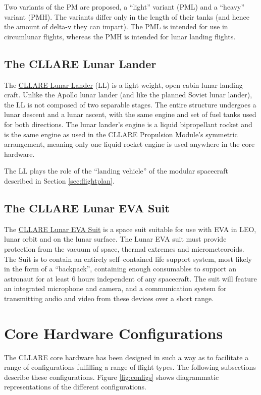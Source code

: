 \documentclass{report}
\begin{document}
Two variants of the PM are proposed, a ``light'' variant (PML) and a ``heavy'' variant (PMH).  The variants differ only in the length of their tanks (and hence the amount of delta-v they can impart). The PML is intended for use in circumlunar flights, whereas the PMH is intended for lunar landing flights.

\subsection{The CLLARE Lunar Lander}

The \href{http://cstart.org/wiki/CLLARE_Lunar_Lander}{CLLARE Lunar Lander} (LL) is a light weight, open cabin lunar landing craft.  Unlike the Apollo lunar lander (and like the planned Soviet lunar lander), the LL is not composed of two separable stages.  The entire structure undergoes a lunar descent and a lunar ascent, with the same engine and set of fuel tanks used for both directions.  The lunar lander's engine is a liquid bipropellant rocket and is the same engine as used in the CLLARE Propulsion Module's symmetric arrangement, meaning only one liquid rocket engine is used anywhere in the core hardware.

The LL plays the role of the ``landing vehicle'' of the modular spacecraft described in Section \ref{sec:flightplan}.

\subsection{The CLLARE Lunar EVA Suit}

The \href{http://cstart.org/wiki/CLLARE_Lunar_EVA_Suit}{CLLARE Lunar EVA Suit} is a space suit suitable for use with EVA in LEO, lunar orbit and on the lunar surface.  The Lunar EVA suit must provide protection from the vacuum of space, thermal extremes and micrometeoroids.  The Suit is to contain an entirely self--contained life support system, most likely in the form of a ``backpack'', containing enough consumables to support an astronaut for at least 6 hours independent of any spacecraft.  The suit will feature an integrated microphone and camera, and a communication system for transmitting audio and video from these devices over a short range.

\section{Core Hardware Configurations} \label{sec:config}

The CLLARE core hardware has been designed in such a way as to facilitate a range of configurations fulfilling a range of flight types.  The following subsections describe these configurations.  Figure \ref{fig:configs} shows diagrammatic representations of the different configurations.
\end{document}
